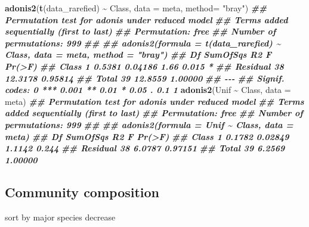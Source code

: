 \documentclass[
]{article}
\newenvironment{Shaded}{\begin{snugshade}}{\end{snugshade}}
\newcommand{\AttributeTok}[1]{\textcolor[rgb]{0.13,0.29,0.53}{#1}}
\newcommand{\DocumentationTok}[1]{\textcolor[rgb]{0.56,0.35,0.01}{\textbf{\textit{#1}}}}
\newcommand{\FunctionTok}[1]{\textcolor[rgb]{0.13,0.29,0.53}{\textbf{#1}}}
\newcommand{\NormalTok}[1]{#1}
\newcommand{\SpecialCharTok}[1]{\textcolor[rgb]{0.81,0.36,0.00}{\textbf{#1}}}
\newcommand{\StringTok}[1]{\textcolor[rgb]{0.31,0.60,0.02}{#1}}
\begin{document}
\begin{Shaded}
\begin{Highlighting}[]
\FunctionTok{adonis2}\NormalTok{(}\FunctionTok{t}\NormalTok{(data\_rarefied) }\SpecialCharTok{\textasciitilde{}}\NormalTok{ Class, }\AttributeTok{data =}\NormalTok{ meta, }\AttributeTok{method=} \StringTok{"bray"}\NormalTok{)}
\DocumentationTok{\#\# Permutation test for adonis under reduced model}
\DocumentationTok{\#\# Terms added sequentially (first to last)}
\DocumentationTok{\#\# Permutation: free}
\DocumentationTok{\#\# Number of permutations: 999}
\DocumentationTok{\#\# }
\DocumentationTok{\#\# adonis2(formula = t(data\_rarefied) \textasciitilde{} Class, data = meta, method = "bray")}
\DocumentationTok{\#\#          Df SumOfSqs      R2    F Pr(\textgreater{}F)  }
\DocumentationTok{\#\# Class     1   0.5381 0.04186 1.66  0.015 *}
\DocumentationTok{\#\# Residual 38  12.3178 0.95814              }
\DocumentationTok{\#\# Total    39  12.8559 1.00000              }
\DocumentationTok{\#\# {-}{-}{-}}
\DocumentationTok{\#\# Signif. codes:  0 \textquotesingle{}***\textquotesingle{} 0.001 \textquotesingle{}**\textquotesingle{} 0.01 \textquotesingle{}*\textquotesingle{} 0.05 \textquotesingle{}.\textquotesingle{} 0.1 \textquotesingle{} \textquotesingle{} 1}
\FunctionTok{adonis2}\NormalTok{(Unif }\SpecialCharTok{\textasciitilde{}}\NormalTok{ Class, }\AttributeTok{data =}\NormalTok{ meta)}
\DocumentationTok{\#\# Permutation test for adonis under reduced model}
\DocumentationTok{\#\# Terms added sequentially (first to last)}
\DocumentationTok{\#\# Permutation: free}
\DocumentationTok{\#\# Number of permutations: 999}
\DocumentationTok{\#\# }
\DocumentationTok{\#\# adonis2(formula = Unif \textasciitilde{} Class, data = meta)}
\DocumentationTok{\#\#          Df SumOfSqs      R2      F Pr(\textgreater{}F)}
\DocumentationTok{\#\# Class     1   0.1782 0.02849 1.1142  0.244}
\DocumentationTok{\#\# Residual 38   6.0787 0.97151              }
\DocumentationTok{\#\# Total    39   6.2569 1.00000}
\end{Highlighting}
\end{Shaded}

\hypertarget{community-composition}{%
\subsection{Community composition}\label{community-composition}}

sort by major species decrease
\end{document}
